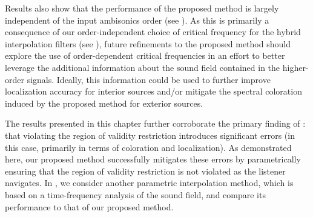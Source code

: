 Results also show that the performance of the proposed method is largely independent of the input ambisonics order (see ).
As this is primarily a consequence of our order-independent choice of critical frequency for the hybrid interpolation filters (see ), future refinements to the proposed method should explore the use of order-dependent critical frequencies in an effort to better leverage the additional information about the sound field contained in the higher-order signals.
Ideally, this information could be used to further improve localization accuracy for interior sources and/or mitigate the spectral coloration induced by the proposed method for exterior sources.

The results presented in this chapter further corroborate the primary finding of : that violating the region of validity restriction introduces significant errors (in this case, primarily in terms of coloration and localization).
As demonstrated here, our proposed method successfully mitigates these errors by parametrically ensuring that the region of validity restriction is not violated as the listener navigates.
In , we consider another parametric interpolation method, which is based on a time-frequency analysis of the sound field, and compare its performance to that of our proposed method.